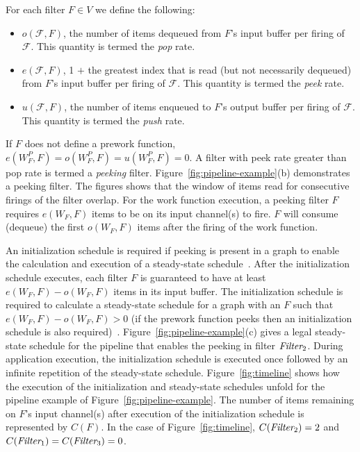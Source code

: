 For each filter $F \in V$ we define the following:
\begin{itemize}

\item $o(\mathcal{F}, F)$, the number of items dequeued from $F$'s
input buffer per firing of $\mathcal{F}$.  This quantity is termed the
{\it pop} rate.

\item $e(\mathcal{F}, F)$, 1 $+$ the greatest index that is read (but
  not necessarily dequeued) from $F$'s input buffer per firing of
  $\mathcal{F}$.  This quantity is termed the {\it peek} rate.

\item $u(\mathcal{F}, F)$, the number of items enqueued to $F$'s
output buffer per firing of $\mathcal{F}$.  This quantity is termed
the {\it push} rate.

\end{itemize}

\noindent If $F$ does not define a prework function, $e(W^P_F, F) = o(W^P_F, F) =
u(W^P_F, F) = 0$.  A filter with peek rate greater than pop rate is
termed a {\it peeking} filter.  Figure~\ref{fig:pipeline-example}(b)
demonstrates a peeking filter.  The figures shows that the window of
items read for consecutive firings of the filter overlap.  For the
work function execution, a peeking filter $F$ requires $e(W_F, F)$
items to be on its input channel(s) to fire.  $F$ will consume
(dequeue) the first $o(W_F, F)$ items after the firing of the work function.

An initialization schedule is required if peeking is present in a
graph to enable the calculation and execution of a steady-state
schedule~\cite{karczma-thesis}.  After the initialization schedule
executes, each filter $F$ is guaranteed to have at least $e(W_F, F) -
o(W_F, F)$ items in its input buffer. The initialization schedule is
required to calculate a steady-state schedule for a graph with an $F$
such that $e(W_F, F) - o(W_F, F) > 0$ (if the prework function peeks
then an initialization schedule is also
required)~\cite{karczmarek-lctes03}.
Figure~\ref{fig:pipeline-example}(c) gives a legal steady-state
schedule for the pipeline that enables the peeking in filter
$\mbox{\it Filter}_2$.  During application execution, the initialization schedule
is executed once followed by an infinite repetition of the
steady-state schedule.  Figure~\ref{fig:timeline} shows how the
execution of the initialization and steady-state schedules unfold for
the pipeline example of Figure~\ref{fig:pipeline-example}.  The number
of items remaining on $F$'s input channel(s) after execution of the
initialization schedule is represented by $C(F)$.  In the case of
Figure~\ref{fig:timeline}, $C(\mbox{\it Filter}_2) = 2$ and
$C(\mbox{\it Filter}_1) = C(\mbox{\it Filter}_3) = 0$.


